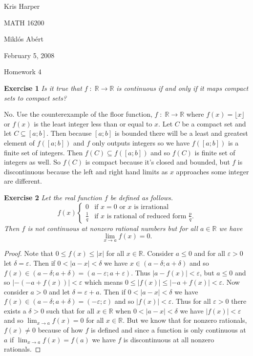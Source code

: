 \documentclass{article}
\begin{document}
\begin{flushright}
Kris Harper

MATH 16200

Mikl\'{o}s Ab\'{e}rt

February 5, 2008
\end{flushright}

\begin{center}
Homework 4
\end{center}

\begin{flushleft}

\textbf{Exercise 1}
\textsl{Is it true that $f \; : \; \mathbb{R} \rightarrow \mathbb{R}$ is continuous if and only if it maps compact sets to compact sets?}\newline

No. Use the counterexample of the floor function, $f \; : \; \mathbb{R} \rightarrow \mathbb{R}$ where $f(x)=\lfloor x \rfloor$ or $f(x)$ is the least integer less than or equal to $x$. Let $C$ be a compact set and let $C \subseteq [a;b]$. Then because $[a;b]$ is bounded there will be a least and greatest element of $f([a;b])$ and $f$ only outputs integers so we have $f([a;b])$ is a finite set of integers. Then $f(C) \subseteq f([a;b])$ and so $f(C)$ is finite set of integers as well. So $f(C)$ is compact because it's closed and bounded, but $f$ is discontinuous because the left and right hand limits as $x$ approaches some integer are different.\newline

\textbf{Exercise 2}
\textsl{Let the real function $f$ be defined as follows.
\[
f(x)
\begin{cases}
0 & \text{if $x=0$ or $x$ is irrational}\\
\frac{1}{q} & \text{if $x$ is rational of reduced form $\frac{p}{q}$}.
\end{cases}
\]
Then $f$ is not continuous at nonzero rational numbers but for all $a \in \mathbb{R}$ we have
\[
\lim_{x \rightarrow a} f(x) = 0.
\]}
\begin{proof}
Note that $0 \leq f(x) \leq |x|$ for all $x \in \mathbb{R}$. Consider $a \leq 0$ and for all $\varepsilon > 0$ let $\delta = \varepsilon$. Then if $0 < |a-x| < \delta$ we have $x \in (a - \delta ; a + \delta)$ and so $f(x) \in (a - \delta ; a + \delta) = (a - \varepsilon ; a + \varepsilon)$. Thus $|a-f(x)| < \varepsilon$, but $a \leq 0$ and so $|-(-a+f(x))| < \varepsilon$ which means $0 \leq |f(x)| \leq |-a+f(x)| < \varepsilon$. Now consider $a > 0$ and let $\delta = \varepsilon + a$. Then if $0 < |a-x| < \delta$ we have $f(x) \in (a - \delta ; a + \delta) = (- \varepsilon ; \varepsilon)$ and so $|f(x)| < \varepsilon$. Thus for all $\varepsilon > 0$ there exists a $\delta> 0$ such that for all $x \in \mathbb{R}$ when $0 < |a-x| < \delta$ we have $|f(x)| < \varepsilon$ and so $\lim_{x \rightarrow a} f(x) = 0$ for all $x \in \mathbb{R}$. But we know that for nonzero rationals, $f(x) \neq 0$ because of how $f$ is defined and since a function is only continuous at $a$ if $\lim_{x \rightarrow a} f(x) =f(a)$ we have $f$ is discontinuous at all nonzero rationals.
\end{proof}


\end{flushleft}
\end{document}
